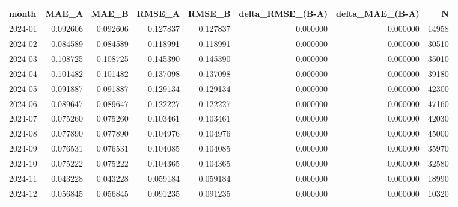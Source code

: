 \begin{tabular}{lrrrrrrr}
\toprule
month & MAE_A & MAE_B & RMSE_A & RMSE_B & delta_RMSE_(B-A) & delta_MAE_(B-A) & N \\
\midrule
2024-01 & 0.092606 & 0.092606 & 0.127837 & 0.127837 & 0.000000 & 0.000000 & 14958 \\
2024-02 & 0.084589 & 0.084589 & 0.118991 & 0.118991 & 0.000000 & 0.000000 & 30510 \\
2024-03 & 0.108725 & 0.108725 & 0.145390 & 0.145390 & 0.000000 & 0.000000 & 35010 \\
2024-04 & 0.101482 & 0.101482 & 0.137098 & 0.137098 & 0.000000 & 0.000000 & 39180 \\
2024-05 & 0.091887 & 0.091887 & 0.129134 & 0.129134 & 0.000000 & 0.000000 & 42300 \\
2024-06 & 0.089647 & 0.089647 & 0.122227 & 0.122227 & 0.000000 & 0.000000 & 47160 \\
2024-07 & 0.075260 & 0.075260 & 0.103461 & 0.103461 & 0.000000 & 0.000000 & 42030 \\
2024-08 & 0.077890 & 0.077890 & 0.104976 & 0.104976 & 0.000000 & 0.000000 & 45000 \\
2024-09 & 0.076531 & 0.076531 & 0.104085 & 0.104085 & 0.000000 & 0.000000 & 35970 \\
2024-10 & 0.075222 & 0.075222 & 0.104365 & 0.104365 & 0.000000 & 0.000000 & 32580 \\
2024-11 & 0.043228 & 0.043228 & 0.059184 & 0.059184 & 0.000000 & 0.000000 & 18990 \\
2024-12 & 0.056845 & 0.056845 & 0.091235 & 0.091235 & 0.000000 & 0.000000 & 10320 \\
\bottomrule
\end{tabular}
